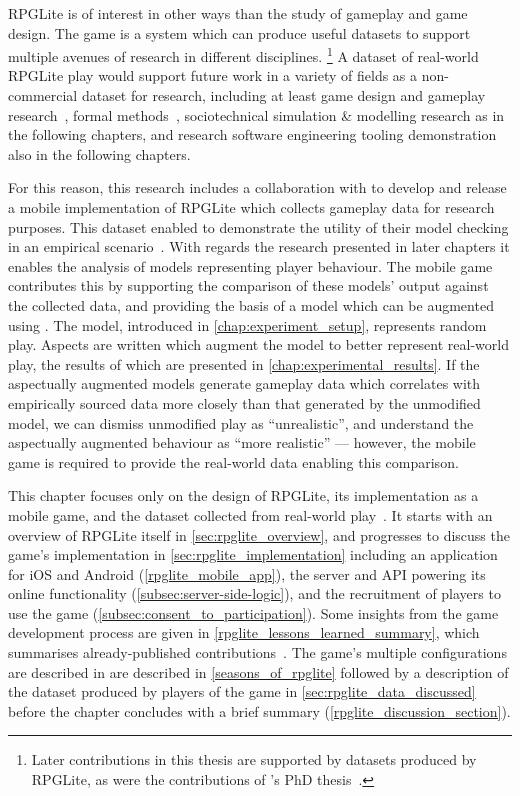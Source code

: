 RPGLite is of interest in other ways than the study of gameplay and game design.
The game is a \sociotechnical system which can produce useful datasets to
support multiple avenues of research in different disciplines. \footnote{Later
contributions in this thesis are supported by datasets produced by RPGLite, as
were the contributions of \citeauthor{kavanagh2021thesis}'s PhD
thesis~\cite{kavanagh2021thesis}. } A dataset of real-world RPGLite play would
support future work in a variety of fields as a non-commercial dataset for
research, including at least game design and gameplay
research~\cite{kavanagh2021thesis}, formal methods~\cite{kavanagh2020},
sociotechnical simulation \& modelling research as in the following chapters,
and research software engineering tooling demonstration also in the following
chapters.

For this reason, this research includes a collaboration with
\citeauthor{kavanagh2021thesis} to develop and release a mobile implementation
of RPGLite which collects gameplay data for research purposes. This dataset
enabled \citeauthor{kavanagh2021thesis} to demonstrate the utility of their
model checking in an empirical scenario~\cite{kavanagh2021thesis}. With regards
the research presented in later chapters it enables the analysis of models
representing player behaviour. The mobile game contributes this by supporting
the comparison of these models' output against the collected data, and providing
the basis of a model which can be augmented using \aop{}. The model, introduced
in \cref{chap:experiment_setup}, represents random play. Aspects are written
which augment the model to better represent real-world play, the results of
which are presented in \cref{chap:experimental_results}. If the aspectually
augmented models generate gameplay data which correlates with empirically
sourced data more closely than that generated by the unmodified model, we can
dismiss unmodified play as ``unrealistic'', and understand the aspectually
augmented behaviour as ``more realistic'' --- however, the mobile game is
required to provide the real-world data enabling this comparison.

This chapter focuses only on the design of RPGLite, its implementation as a
mobile game, and the dataset collected from real-world
play~\cite{RPGLiteLessonsLearned}. It starts with an overview of RPGLite itself
in \cref{sec:rpglite_overview}, and progresses to discuss the game's
implementation in \cref{sec:rpglite_implementation} including an application for
iOS and Android (\cref{rpglite_mobile_app}), the server and API powering its
online functionality (\cref{subsec:server-side-logic}), and the recruitment of
players to use the game (\cref{subsec:consent_to_participation}). Some insights
from the game development process are given in
\cref{rpglite_lessons_learned_summary}, which summarises already-published
contributions~\cite{RPGLiteLessonsLearned}. The game's multiple configurations
are described in are described in \cref{seasons_of_rpglite} followed by a
description of the dataset produced by players of the game in
\cref{sec:rpglite_data_discussed} before the chapter concludes with a brief
summary (\cref{rpglite_discussion_section}).

